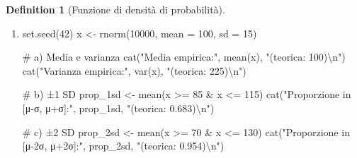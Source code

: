 \documentclass[
  letterpaper,
  DIV=11,
  numbers=noendperiod,
  oneside]{scrreprt}
\newenvironment{Shaded}{\begin{snugshade}}{\end{snugshade}}
\newcommand{\AttributeTok}[1]{\textcolor[rgb]{0.40,0.45,0.13}{#1}}
\newcommand{\CommentTok}[1]{\textcolor[rgb]{0.37,0.37,0.37}{#1}}
\newcommand{\DecValTok}[1]{\textcolor[rgb]{0.68,0.00,0.00}{#1}}
\newcommand{\FunctionTok}[1]{\textcolor[rgb]{0.28,0.35,0.67}{#1}}
\newcommand{\NormalTok}[1]{\textcolor[rgb]{0.00,0.23,0.31}{#1}}
\newcommand{\OtherTok}[1]{\textcolor[rgb]{0.00,0.23,0.31}{#1}}
\newcommand{\SpecialCharTok}[1]{\textcolor[rgb]{0.37,0.37,0.37}{#1}}
\newcommand{\StringTok}[1]{\textcolor[rgb]{0.13,0.47,0.30}{#1}}
\theoremstyle{definition}
\theoremstyle{plain}
\theoremstyle{definition}
\newtheorem{definition}{Definition}[chapter]
\theoremstyle{remark}
\begin{document}
\begin{definition}[Funzione di densità di
probabilità]
\begin{tcolorbox}
\begin{enumerate}
\begin{Shaded}
\begin{Highlighting}[]
\NormalTok{  gridExtra}\SpecialCharTok{::}\FunctionTok{grid.arrange}\NormalTok{(p1, p2, }\AttributeTok{ncol =} \DecValTok{2}\NormalTok{)}
\NormalTok{\}}
\end{Highlighting}
\end{Shaded}
\item
\begin{Shaded}
\begin{Highlighting}[]
\FunctionTok{set.seed}\NormalTok{(}\DecValTok{42}\NormalTok{)}
\NormalTok{x }\OtherTok{\textless{}{-}} \FunctionTok{rnorm}\NormalTok{(}\DecValTok{10000}\NormalTok{, }\AttributeTok{mean =} \DecValTok{100}\NormalTok{, }\AttributeTok{sd =} \DecValTok{15}\NormalTok{)}

\CommentTok{\# a) Media e varianza}
\FunctionTok{cat}\NormalTok{(}\StringTok{"Media empirica:"}\NormalTok{, }\FunctionTok{mean}\NormalTok{(x), }\StringTok{"(teorica: 100)}\SpecialCharTok{\textbackslash{}n}\StringTok{"}\NormalTok{)}
\FunctionTok{cat}\NormalTok{(}\StringTok{"Varianza empirica:"}\NormalTok{, }\FunctionTok{var}\NormalTok{(x), }\StringTok{"(teorica: 225)}\SpecialCharTok{\textbackslash{}n}\StringTok{"}\NormalTok{)}

\CommentTok{\# b) ±1 SD}
\NormalTok{prop\_1sd }\OtherTok{\textless{}{-}} \FunctionTok{mean}\NormalTok{(x }\SpecialCharTok{\textgreater{}=} \DecValTok{85} \SpecialCharTok{\&}\NormalTok{ x }\SpecialCharTok{\textless{}=} \DecValTok{115}\NormalTok{)}
\FunctionTok{cat}\NormalTok{(}\StringTok{"Proporzione in [μ{-}σ, μ+σ]:"}\NormalTok{, prop\_1sd, }\StringTok{"(teorica: 0.683)}\SpecialCharTok{\textbackslash{}n}\StringTok{"}\NormalTok{)}

\CommentTok{\# c) ±2 SD}
\NormalTok{prop\_2sd }\OtherTok{\textless{}{-}} \FunctionTok{mean}\NormalTok{(x }\SpecialCharTok{\textgreater{}=} \DecValTok{70} \SpecialCharTok{\&}\NormalTok{ x }\SpecialCharTok{\textless{}=} \DecValTok{130}\NormalTok{)}
\FunctionTok{cat}\NormalTok{(}\StringTok{"Proporzione in [μ{-}2σ, μ+2σ]:"}\NormalTok{, prop\_2sd, }\StringTok{"(teorica: 0.954)}\SpecialCharTok{\textbackslash{}n}\StringTok{"}\NormalTok{)}
\end{Highlighting}
\end{Shaded}
\end{enumerate}

\end{tcolorbox}

\begin{tcolorbox}[enhanced jigsaw, arc=.35mm, breakable, colbacktitle=quarto-callout-note-color!10!white, opacityback=0, toprule=.15mm, rightrule=.15mm, colback=white, opacitybacktitle=0.6, leftrule=.75mm, coltitle=black, bottomtitle=1mm, left=2mm, toptitle=1mm, title=\textcolor{quarto-callout-note-color}{\faInfo}\hspace{0.5em}{Informazioni sull'ambiente di sviluppo}, titlerule=0mm, bottomrule=.15mm, colframe=quarto-callout-note-color-frame]


\end{tcolorbox}
\end{definition}
\end{document}
